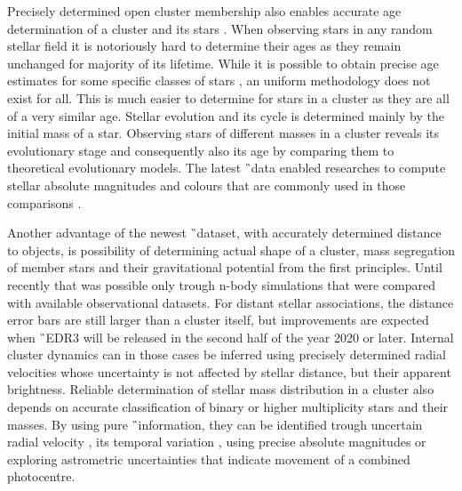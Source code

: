 Precisely determined open cluster membership also enables accurate age determination of a cluster and its stars \cite{2018ApJ...863...65C}. When observing stars in any random stellar field it is notoriously hard to determine their ages as they remain unchanged for majority of its lifetime. While it is possible to obtain precise age estimates for some specific classes of stars \cite{2010ARA&A..48..581S}, an uniform methodology does not exist for all. This is much easier to determine for stars in a cluster as they are all of a very similar age. Stellar evolution and its cycle is determined mainly by the initial mass of a star. Observing stars of different masses in a cluster reveals its evolutionary stage and consequently also its age by comparing them to theoretical evolutionary models. The latest \G\ data enabled researches to compute stellar absolute magnitudes and colours that are commonly used in those comparisons \cite{2019MNRAS.487.2385M, 2019A&A...623A.108B, 2019A&A...631A.166K}.

Another advantage of the newest \G\ dataset, with accurately determined distance to objects, is possibility of determining actual shape of a cluster, mass segregation of member stars and their gravitational potential from the first principles. Until recently that was possible only trough n-body simulations \cite{1987MNRAS.224..193T, 2016MNRAS.456.3757S, 2018MNRAS.473..849D} that were compared with available observational datasets. For distant stellar associations, the distance error bars are still larger than a cluster itself, but improvements are expected when \G\ EDR3 will be released in the second half of the year 2020 or later. Internal cluster dynamics can in those cases be inferred using precisely determined radial velocities whose uncertainty is not affected by stellar distance, but their apparent brightness. Reliable determination of stellar mass distribution in a cluster also depends on accurate classification of binary or higher multiplicity stars and their masses. By using pure \G\ information, they can be identified trough uncertain radial velocity \cite{2018RNAAS...2b..20E}, its temporal variation \cite{2019AJ....158..155B}, using precise absolute magnitudes \cite{2018ApJ...857..114W, 2018A&A...616A..10G, 2019MNRAS.487.2474C} or exploring astrometric uncertainties \cite{2020arXiv200305467B} that indicate movement of a combined photocentre. 

